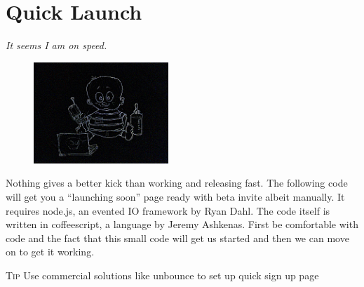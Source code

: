 \documentclass[12pt]{book}
\begin{document}



\chapter{Quick Launch}
\begin{flushright}\textit{It seems I am on speed.}\end{flushright}

\begin{figure}
\begin{center}\includegraphics[width=2in]{org/art/getStartedHigh.png}\end{center}
\end{figure}

Nothing gives a better kick than working and releasing fast. The following code will get you a ``launching soon'' page ready with beta invite albeit manually. It requires node.js, an evented IO framework by Ryan Dahl. The code itself is written in coffeescript, a language by Jeremy Ashkenas.
First be comfortable with code and the fact that this small code will get us started and then we can move on to get it working.

\vspace{0.6cm}\vspace{0.6cm}

\colorbox{tipcolour}{\tiny \textsc{Tip} \small Use commercial solutions like unbounce to set up quick sign up page}


\end{document}

